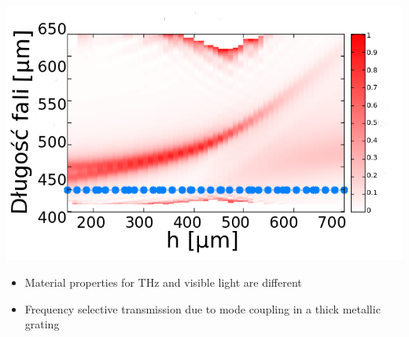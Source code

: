\documentclass{beamer}
\begin{document}
\begin{frame}
\begin{columns}
\begin{column}{0.5\textwidth}
				\includegraphics[width=\textwidth]{../images/antenaThz/rez_trans_L.png}\\
		\begin{itemize}
			\item Material properties for THz and visible light are different
			\item Frequency selective transmission due to mode coupling in a thick metallic grating
		\end{itemize}	
		\end{column}
	\end{columns}
		
\end{frame}
\end{document}
